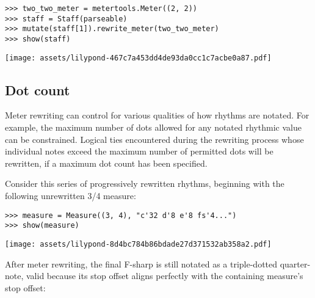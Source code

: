 \begin{abjadbookoutput}
\begin{singlespacing}
\vspace{-0.5\baselineskip}
\begin{verbatim}
>>> two_two_meter = metertools.Meter((2, 2))
>>> staff = Staff(parseable)
>>> mutate(staff[1]).rewrite_meter(two_two_meter)
>>> show(staff)
\end{verbatim}
\noindent\texttt{[image: assets/lilypond-467c7a453dd4de93da0cc1c7acbe0a87.pdf]}
\end{singlespacing}
\end{abjadbookoutput}

\subsection{Dot count} %

Meter rewriting can control for various qualities of how rhythms are notated.
For example, the maximum number of dots allowed for any notated rhythmic value
can be constrained. Logical ties encountered during the rewriting process whose
individual notes exceed the maximum number of permitted dots will be rewritten,
if a maximum dot count has been specified.

Consider this series of progressively rewritten rhythms, beginning with the
following unrewritten 3/4 measure:

\begin{comment}
<abjad>
measure = Measure((3, 4), "c'32 d'8 e'8 fs'4...")
show(measure)
</abjad>
\end{comment}

\begin{abjadbookoutput}
\begin{singlespacing}
\vspace{-0.5\baselineskip}
\begin{verbatim}
>>> measure = Measure((3, 4), "c'32 d'8 e'8 fs'4...")
>>> show(measure)
\end{verbatim}
\noindent\texttt{[image: assets/lilypond-8d4bc784b86bdade27d371532ab358a2.pdf]}
\end{singlespacing}
\end{abjadbookoutput}

\noindent After meter rewriting, the final F-sharp is still notated as a
triple-dotted quarter-note, valid because its stop offset aligns perfectly with
the containing measure's stop offset:

